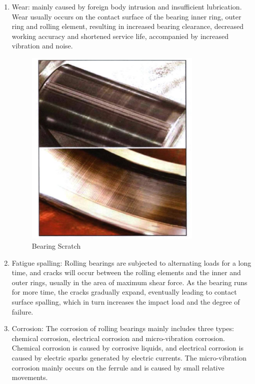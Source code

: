 \documentclass{article}
\begin{document}
\begin{enumerate}
    \item Wear: mainly caused by foreign body intrusion and insufficient lubrication. Wear usually occurs on the contact surface of the bearing inner ring, outer ring and rolling element, resulting in increased bearing clearance, decreased working accuracy and shortened service life, accompanied by increased vibration and noise.
    \begin{figure}[htbp]
        \centering
        \includegraphics[width=0.8\textwidth]{./滚体擦伤.png}
        \caption{Bearing Scratch}
        \label{fig:bear-scratch}
    \end{figure}
    \item Fatigue spalling: Rolling bearings are subjected to alternating loads for a long time, and cracks will occur between the rolling elements and the inner and outer rings, usually in the area of maximum shear force. As the bearing runs for more time, the cracks gradually expand, eventually leading to contact surface spalling, which in turn increases the impact load and the degree of failure.
    \item Corrosion: The corrosion of rolling bearings mainly includes three types: chemical corrosion, electrical corrosion and micro-vibration corrosion. Chemical corrosion is caused by corrosive liquids, and electrical corrosion is caused by electric sparks generated by electric currents. The micro-vibration corrosion mainly occurs on the ferrule and is caused by small relative movements.

\end{enumerate}
\end{document}
